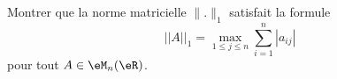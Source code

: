 \begin{exercice}[\coolexo]\label{exoGeomAnal-0042}

Montrer que la norme matricielle \( \| . \|_1\) satisfait la formule 
\begin{equation}
||A||_1=\max_{1\le j\le n}\sum_{i=1}^n|a_{ij}|
\end{equation}
pour tout $A\in \eM_n(\eR)$.

\end{exercice}
